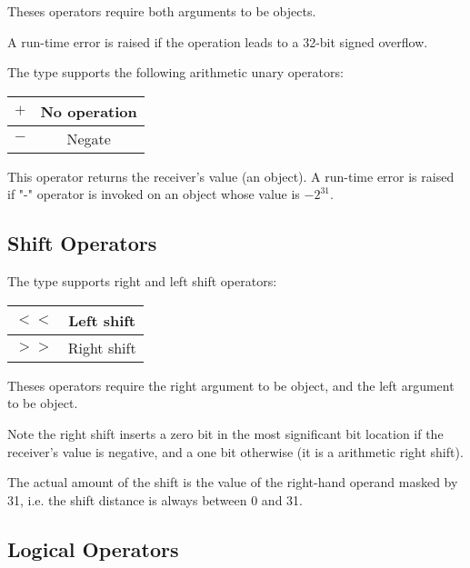 Theses operators require both arguments to be  objects.\newline

A run-time error is raised if the operation leads to a 32-bit signed overflow.

The  type supports the following arithmetic unary operators:\newline

\begin{tabular}{|c|c|}
\hline
$+$ & No operation \\
\hline
$-$ & Negate \\
\hline
\end{tabular}

This operator returns the receiver's value (an  object). A run-time error is raised if "-" operator is invoked on an object whose value is $-2^{31}$.






\subsection{Shift Operators}


The  type supports right and left shift operators:\newline

\begin{tabular}{|c|c|}
\hline
$<<$ & Left shift \\
\hline
$>>$ & Right shift \\
\hline
\end{tabular}

Theses operators require the right argument to be  object, and the left argument to be  object.\newline

Note the right shift inserts a zero bit in the most significant bit location if the receiver's value is negative, and a one bit otherwise (it is a arithmetic right shift).\newline

The actual amount of the shift is the value of the right-hand operand masked by 31, i.e. the shift distance is always between 0 and 31.




\subsection{Logical Operators}

